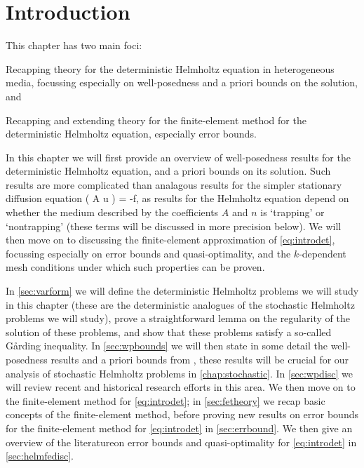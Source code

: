 \section{Introduction}
This chapter has two main foci:
\ben
\item Recapping theory for the deterministic Helmholtz equation in heterogeneous media, focussing especially on well-posedness and a priori bounds on the solution, and
\item Recapping and extending theory for the finite-element method for the deterministic Helmholtz equation, especially error bounds.
  \een

  In this chapter we will first provide an overview of well-posedness results for the deterministic Helmholtz equation, and a priori bounds on its solution. Such results are more complicated than analagous results for the simpler stationary diffusion equation
  \beqs
\grad \cdot \mleft( A \grad u \mright) = -f,
\eeqs
as results for the Helmholtz equation depend on whether the medium described by the coefficients $A$ and $n$ is `trapping' or `nontrapping' (these terms will be discussed in more precision below). We will then move on to discussing the finite-element approximation of \eqref{eq:introdet}, focussing especially on error bounds and quasi-optimality, and the $k$-dependent mesh conditions under which such properties can be proven.

In \cref{sec:varform} we will define the deterministic Helmholtz problems we will study in this chapter (these are the deterministic analogues of the stochastic Helmholtz problems we will study), prove a straightforward lemma on the regularity of the solution of these problems, and show that these problems satisfy a so-called G\r{a}rding inequality. In \cref{sec:wpbounds} we will then state in some detail the well-posedness results and a priori bounds from \cite{GrPeSp:19}, these results will be crucial for our analysis of stochastic Helmholtz problems in \cref{chap:stochastic}. In \cref{sec:wpdisc} we will review recent and historical research efforts in this area. We then move on to the finite-element method for \eqref{eq:introdet}; in \cref{sec:fetheory} we recap basic concepts of the finite-element method, before proving new results on error bounds for the finite-element method for \eqref{eq:introdet} in \cref{sec:errbound}. We then give an overview of the literatureon error bounds and quasi-optimality for \eqref{eq:introdet} in \cref{sec:helmfedisc}.


